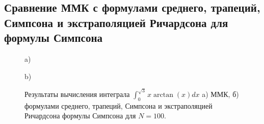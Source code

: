 \documentclass[
11pt,
master, %
subf, %
href, %
colorlinks=true, %
times, %
]{disser}
\begin{document}
\subsection{Сравнение ММК с формулами среднего, трапеций, Симпсона и экстраполяцией Ричардсона для формулы Симпсона}
\begin{figure}[h]
\begin{minipage}[h]{0.48\linewidth}
 a) \\
\end{minipage}
\hfill
\begin{minipage}[h]{0.48\linewidth}
 b) \\
\end{minipage}
\hfill
\caption{Результаты вычисления интеграла $\int_{0}^{\sqrt{3}} x\arctan(x)dx$ a) ММК, б) формулами среднего, трапеций, Симпсона и экстраполяцией Ричардсона формулы Симпсона для $N = 100$.}
\label{ris:2}
\end{figure}
\end{document}
